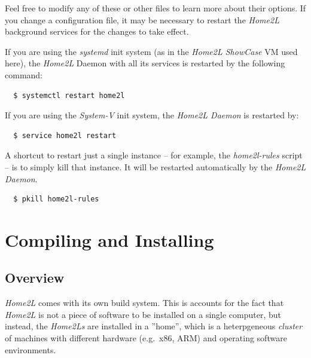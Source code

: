 \documentclass[12pt,english,parskip=half]{scrreprt}
\begin{document}
Feel free to modify any of these or other files to learn more about
their options. If you change a configuration file, it may be necessary
to restart the \emph{Home2L} background services for the changes to take
effect.

If you are using the \emph{systemd} init system (as in the \emph{Home2L
ShowCase} VM used here), the \emph{Home2L} Daemon with all its services
is restarted by the following command:

\begin{lstlisting}
  $ systemctl restart home2l
\end{lstlisting}

If you are using the \emph{System-V} init system, the \emph{Home2L Daemon}
is restarted by:

\begin{lstlisting}
  $ service home2l restart
\end{lstlisting}

A shortcut to restart just a single instance -- for example, the
\emph{home2l-rules} script -- is to simply kill that instance. It will
be restarted automatically by the \emph{Home2L Daemon}.

\begin{lstlisting}
  $ pkill home2l-rules
\end{lstlisting}





%
\chapter{Compiling and Installing}
\label{ch:installing}
%




\section{Overview}
\label{sec:installing-intro}


\emph{Home2L} comes with its own build system. This is accounts for
the fact that \emph{Home2L} is not a piece of software to be installed
on a single computer, but instead, the \emph{Home2Ls} are installed in a
''home'', which is a heterpgeneous \emph{cluster} of machines with
different hardware (e.g.~x86, ARM) and operating software environments.
\end{document}
